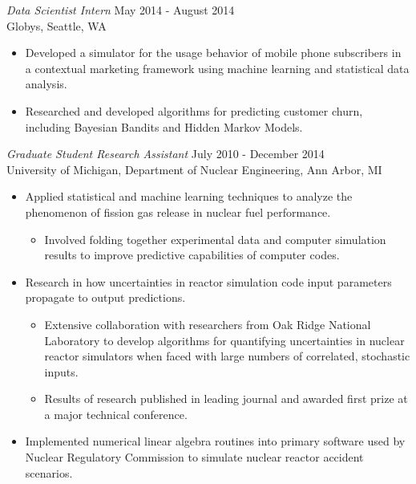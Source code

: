 \documentclass[margin, 10pt]{res} %
\begin{document}
\begin{resume}
{\sl Data Scientist Intern} \hfill May 2014 - August 2014 \\
Globys, Seattle, WA

\begin{itemize} \itemsep -2pt %
\item Developed a simulator for the usage behavior of mobile phone subscribers in a contextual marketing framework using machine learning and statistical data analysis.
\item Researched and developed algorithms for predicting customer churn, including Bayesian Bandits and Hidden Markov Models. 
\end{itemize}

{\sl Graduate Student Research Assistant} \hfill July 2010 - December 2014 \\
University of Michigan, Department of Nuclear Engineering, Ann Arbor, MI

\begin{itemize} \itemsep -2pt %
\item Applied statistical and machine learning techniques to analyze the phenomenon of fission gas release in nuclear fuel performance. 
\begin{itemize}
\item Involved folding together experimental data and computer simulation results to improve predictive capabilities of computer codes. 
\end{itemize}
\item Research in how uncertainties in reactor simulation code input parameters propagate to output predictions.
\begin{itemize}
\item Extensive collaboration with researchers from Oak Ridge National Laboratory to develop algorithms for quantifying uncertainties in nuclear reactor simulators when faced with large numbers of correlated, stochastic inputs.
\item Results of research published in leading journal and awarded first prize at a major technical conference.
\end{itemize}
\item Implemented numerical linear algebra routines into primary software used by Nuclear Regulatory Commission to simulate nuclear reactor accident scenarios.
\end{itemize}



\end{resume}
\end{document}
